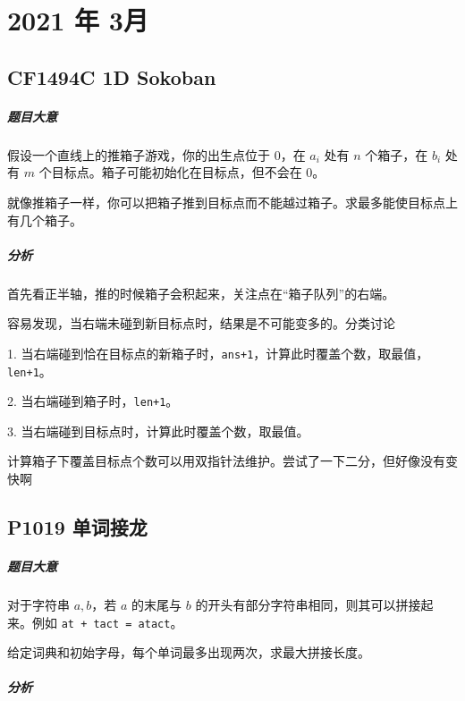 \chapter{2021 年 3月}

\section{CF1494C 1D Sokoban}

\paragraph{题目大意}

假设一个直线上的推箱子游戏，你的出生点位于 $0$，在 $a_i$ 处有 $n$ 个箱子，在 $b_i$ 处有 $m$ 个目标点。箱子可能初始化在目标点，但不会在 $0$。

就像推箱子一样，你可以把箱子推到目标点而不能越过箱子。求最多能使目标点上有几个箱子。

\paragraph{分析}

首先看正半轴，推的时候箱子会积起来，关注点在“箱子队列”的右端。

容易发现，当右端未碰到新目标点时，结果是不可能变多的。分类讨论

1. 当右端碰到恰在目标点的新箱子时，\verb`ans+1`，计算此时覆盖个数，取最值，\verb`len+1`。

2. 当右端碰到箱子时，\verb`len+1`。

3. 当右端碰到目标点时，计算此时覆盖个数，取最值。

计算箱子下覆盖目标点个数可以用双指针法维护。尝试了一下二分，但好像没有变快啊

\section{P1019 单词接龙}

\paragraph{题目大意}

对于字符串 $a,b$，若 $a$ 的末尾与 $b$ 的开头有部分字符串相同，则其可以拼接起来。例如 \verb`at + tact = atact`。

给定词典和初始字母，每个单词最多出现两次，求最大拼接长度。

\paragraph{分析}

